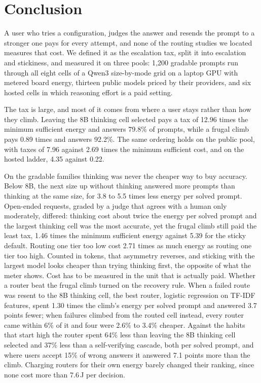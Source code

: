 \section{Conclusion}
\label{sec:conclusion}

A user who tries a configuration, judges the answer and resends the prompt
to a stronger one pays for every attempt, and none of the routing studies we
located measures that cost. We defined it as the escalation tax, split it
into escalation and stickiness, and measured it on three pools: 1{,}200
gradable prompts run through all eight cells of a Qwen3 size-by-mode grid on
a laptop GPU with metered board energy, thirteen public models priced by
their providers, and six hosted cells in which reasoning effort is a paid
setting.

The tax is large, and most of it comes from where a user stays rather than
how they climb. Leaving the 8B thinking cell selected pays a tax of 12.96
times the minimum sufficient energy and answers 79.8\% of prompts, while a
frugal climb pays 0.89 times and answers 92.2\%. The same ordering holds on
the public pool, with taxes of 7.96 against 2.69 times the minimum
sufficient cost, and on the hosted ladder, 4.35 against 0.22.

On the gradable families thinking was never the cheaper way to buy accuracy.
Below 8B, the next size up without thinking answered more prompts than
thinking at the same size, for 3.8 to 5.5 times less energy per solved
prompt. Open-ended requests, graded by a judge that agrees with a human only
moderately, differed: thinking cost about twice the energy per solved prompt
and the largest thinking cell was the most accurate, yet the frugal climb
still paid the least tax, 1.46 times the minimum sufficient energy against
5.39 for the sticky default. Routing
one tier too low cost 2.71 times as much energy as routing one tier too
high. Counted in tokens, that asymmetry reverses, and sticking with the
largest model looks cheaper than trying thinking first, the opposite of what
the meter shows. Cost has to be measured in the unit that is actually paid.
Whether a router beat the frugal climb turned on the recovery rule. When a
failed route was resent to the 8B thinking cell, the best router, logistic
regression on TF-IDF features, spent 1.30 times the climb's energy per
solved prompt and answered 3.7 points fewer; when failures climbed from the
routed cell instead, every router came within 6\% of it and four were 2.6\%
to 3.4\% cheaper. Against the habits that start high the router spent 64\%
less than leaving the 8B thinking cell selected and 37\% less than a
self-verifying cascade, both per solved prompt, and where users accept 15\%
of wrong answers it answered 7.1 points more than the climb. Charging
routers for their own energy barely changed their ranking, since none cost
more than 7.6\,J per decision.

